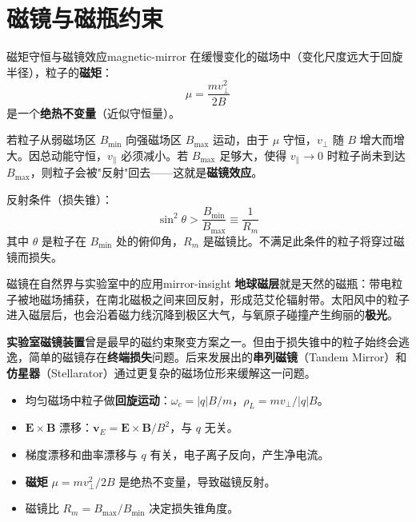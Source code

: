 \documentclass[12pt,a4paper,openany,oneside]{book}
\newcommand{\vect}[1]{\bm{#1}}
\newcommand{\difficulty}[1]{\marginnote{\textcolor{red}{\textbf{[#1]}}}}
\begin{document}
\section{磁镜与磁瓶约束}\difficulty{提高}

\begin{theorem}{磁矩守恒与磁镜效应}{magnetic-mirror}
在缓慢变化的磁场中（变化尺度远大于回旋半径），粒子的\textbf{磁矩}：
\[
\mu = \frac{m v_\perp^2}{2B}
\]
是一个\textbf{绝热不变量}（近似守恒量）。

若粒子从弱磁场区 $B_{\min}$ 向强磁场区 $B_{\max}$ 运动，由于 $\mu$ 守恒，$v_\perp$ 随 $B$ 增大而增大。因总动能守恒，$v_\parallel$ 必须减小。若 $B_{\max}$ 足够大，使得 $v_\parallel \to 0$ 时粒子尚未到达 $B_{\max}$，则粒子会被"反射"回去——这就是\textbf{磁镜效应}。

反射条件（损失锥）：
\[
\sin^2\theta > \frac{B_{\min}}{B_{\max}} \equiv \frac{1}{R_m}
\]
其中 $\theta$ 是粒子在 $B_{\min}$ 处的俯仰角，$R_m$ 是磁镜比。不满足此条件的粒子将穿过磁镜而损失。
\end{theorem}

\begin{insight}{磁镜在自然界与实验室中的应用}{mirror-insight}
\textbf{地球磁层}就是天然的磁瓶：带电粒子被地磁场捕获，在南北磁极之间来回反射，形成范艾伦辐射带。太阳风中的粒子进入磁层后，也会沿着磁力线沉降到极区大气，与氧原子碰撞产生绚丽的\textbf{极光}。

\textbf{实验室磁镜装置}曾是最早的磁约束聚变方案之一。但由于损失锥中的粒子始终会逃逸，简单的磁镜存在\textbf{终端损失}问题。后来发展出的\textbf{串列磁镜}（Tandem Mirror）和\textbf{仿星器}（Stellarator）通过更复杂的磁场位形来缓解这一问题。
\end{insight}

\begin{chapterreview}
\begin{itemize}
\item 均匀磁场中粒子做\textbf{回旋运动}：$\omega_c = |q|B/m$，$\rho_L = mv_\perp/|q|B$。
\item $\vect{E}\times\vect{B}$ 漂移：$\vect{v}_E = \vect{E}\times\vect{B}/B^2$，与 $q$ 无关。
\item 梯度漂移和曲率漂移与 $q$ 有关，电子离子反向，产生净电流。
\item \textbf{磁矩} $\mu = mv_\perp^2/2B$ 是绝热不变量，导致磁镜反射。
\item 磁镜比 $R_m = B_{\max}/B_{\min}$ 决定损失锥角度。
\end{itemize}
\end{chapterreview}
\end{document}
